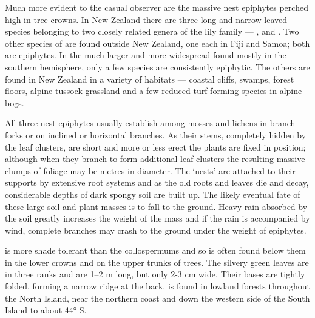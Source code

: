 Much more evident to the casual observer are the massive nest epiphytes perched high in tree crowns.
In New Zealand there are three long and narrow-leaved species belonging to two closely related genera of the lily family — ,  and .
Two other species of  are found outside New Zealand, one each in Fiji and Samoa; both are epiphytes.
In the much larger and more widespread  found mostly in the southern hemisphere, only a few species are consistently epiphytic.
The others are found in New Zealand in a variety of habitats — coastal cliffs, swamps, forest floors, alpine tussock grassland and a few reduced turf-forming species in alpine bogs.

All three nest epiphytes usually establish among mosses and lichens in branch forks or on inclined or horizontal branches.
As their stems, completely hidden by the leaf clusters, are short and more or less erect the plants are fixed in position; although when they branch to form additional leaf clusters the resulting massive clumps of foliage may be metres in diameter.
The `nests' are attached to their supports by extensive root systems and as the old roots and leaves die and decay, considerable depths of dark spongy soil are built up.
The likely eventual fate of these large soil and plant masses is to fall to the ground.
Heavy rain absorbed by the soil greatly increases the weight of the mass and if the rain is accompanied by wind, complete branches may crash to the ground under the weight of epiphytes.

 is more shade tolerant than the collospermums and so is often found below them in the lower crowns and on the upper trunks of trees.
The silvery green leaves are in three ranks and are 1–2 m long, but only 2-3 cm wide.
Their bases are tightly folded, forming a narrow ridge at the back.  is found in lowland forests throughout the North Island, near the northern coast and down the western side of the South Island to about 44° S.


